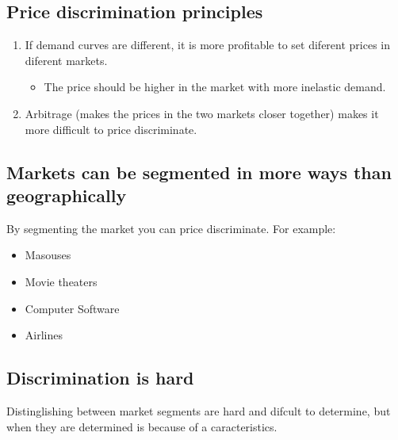 \documentclass{article}
\begin{document}
\subsection{Price discrimination principles}
\begin{enumerate}
    \item If demand curves are different, it is more profitable to set diferent prices in diferent markets.
        \begin{itemize}
            \item The price should be higher in the market with more inelastic demand.
        \end{itemize}
    
    \item Arbitrage (makes the prices in the two markets closer together) makes it more difficult to price discriminate. 
\end{enumerate} 


\subsection{Markets can be segmented in more ways than geographically}
By segmenting the market you can price discriminate. For example:
\begin{itemize}
    \item Masouses
    \item Movie theaters
    \item Computer Software 
    \item Airlines 
\end{itemize}


\subsection{Discrimination is hard}
Distinglishing between market segments are hard and difcult to determine, but when they are determined is because of a caracteristics. 



\end{document}
